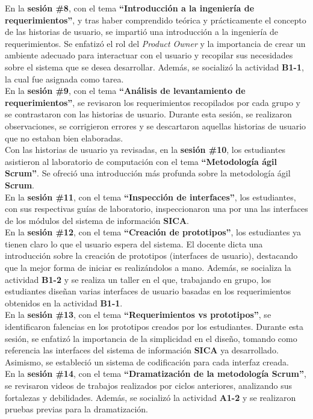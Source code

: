 \documentclass[12pt]{article}
\begin{document}
\begin{multicols}{2}
En la \textbf{sesión \#8}, con el tema \textbf{``Introducción a la ingeniería de requerimientos''}, y tras haber comprendido teórica y prácticamente el concepto de las historias de usuario, se impartió una introducción a la ingeniería de requerimientos. Se enfatizó el rol del \textit{Product Owner} y la importancia de crear un ambiente adecuado para interactuar con el usuario y recopilar sus necesidades sobre el sistema que se desea desarrollar. Además, se socializó la actividad \textbf{B1-1}, la cual fue asignada como tarea.\\
En la \textbf{sesión \#9}, con el tema \textbf{``Análisis de levantamiento de requerimientos''}, se revisaron los requerimientos recopilados por cada grupo y se contrastaron con las historias de usuario. Durante esta sesión, se realizaron observaciones, se corrigieron errores y se descartaron aquellas historias de usuario que no estaban bien elaboradas.\\
Con las historias de usuario ya revisadas, en la \textbf{sesión \#10}, los estudiantes asistieron al laboratorio de computación con el tema \textbf{``Metodología ágil Scrum''}. Se ofreció una introducción más profunda sobre la metodología ágil \textbf{Scrum}.\\
En la \textbf{sesión \#11}, con el tema \textbf{``Inspección de interfaces''}, los estudiantes, con sus respectivas guías de laboratorio, inspeccionaron una por una las interfaces de los módulos del sistema de información \textbf{SICA}.\\
En la \textbf{sesión \#12}, con el tema \textbf{``Creación de prototipos''}, los estudiantes ya tienen claro lo que el usuario espera del sistema. El docente dicta una introducción sobre la creación de prototipos (interfaces de usuario), destacando que la mejor forma de iniciar es realizándolos a mano. Además, se socializa la actividad \textbf{B1-2} y se realiza un taller en el que, trabajando en grupo, los estudiantes diseñan varias interfaces de usuario basadas en los requerimientos obtenidos en la actividad \textbf{B1-1}.\\
En la \textbf{sesión \#13}, con el tema \textbf{``Requerimientos vs prototipos''}, se identificaron falencias en los prototipos creados por los estudiantes. Durante esta sesión, se enfatizó la importancia de la simplicidad en el diseño, tomando como referencia las interfaces del sistema de información \textbf{SICA} ya desarrollado. Asimismo, se estableció un sistema de codificación para cada interfaz creada.\\
En la \textbf{sesión \#14}, con el tema \textbf{``Dramatización de la metodología Scrum''}, se revisaron videos de trabajos realizados por ciclos anteriores, analizando sus fortalezas y debilidades. Además, se socializó la actividad \textbf{A1-2} y se realizaron pruebas previas para la dramatización.\\

\end{multicols}
\end{document}
